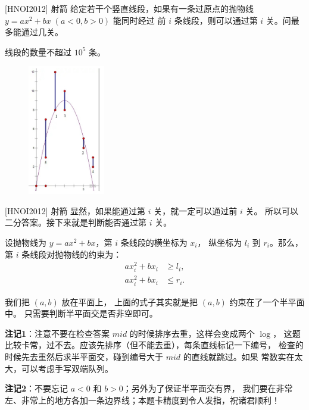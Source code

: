 \documentclass{beamer}
\begin{document}
\begin{frame}{[HNOI2012] 射箭}
    \small
    给定若干个竖直线段，如果有一条过原点的抛物线 $y=ax^2+bx\;(a<0,b>0)$ 能同时经过
    前 $i$ 条线段，则可以通过第 $i$ 关。问最多能通过几关。

    \vspace{1em}
    线段的数量不超过 $10^5$ 条。
    \begin{figure}[H]
        \centering
        \includegraphics[width=0.3\textwidth]{pic/hnoi2012.png}
    \end{figure}
\end{frame}

\begin{frame}{[HNOI2012] 射箭}
    \footnotesize
    显然，如果能通过第 $i$ 关，就一定可以通过前 $i$ 关。
    所以可以二分答案。接下来就是判断能否通过第 $i$ 关。

    \vspace{.5em}\pause
    设抛物线为 $y=ax^2+bx$，第 $i$ 条线段的横坐标为 $x_i$，
    纵坐标为 $l_i$ 到 $r_i$。那么，第 $i$ 条线段对抛物线的约束为：
    \begin{align}
        ax_i^2 + bx_i &\geq l_i,\\
        ax_i^2 + bx_i &\leq r_i.
    \end{align}

    \vspace{.5em}\pause
    我们把 $(a,b)$ 放在平面上，
    上面的式子其实就是把 $(a,b)$ 约束在了一个半平面中。
    只需要判断半平面交是否非空即可。

    \vspace{.5em}\pause
    \textbf{注记1}：注意不要在检查答案 $mid$ 的时候排序去重，这样会变成两个 $\log$，
    这题比较卡常，过不去。应该先排序（但不能去重），每条直线标记一下编号，
    检查的时候先去重然后求半平面交，碰到编号大于 $mid$ 的直线就跳过。如果
    常数实在太大，可以考虑手写双端队列。

    \textbf{注记2}：不要忘记 $a<0$ 和 $b>0$；另外为了保证半平面交有界，
    我们要在非常左、非常上的地方各加一条边界线；本题卡精度到令人发指，祝诸君顺利！
\end{frame}
\end{document}

